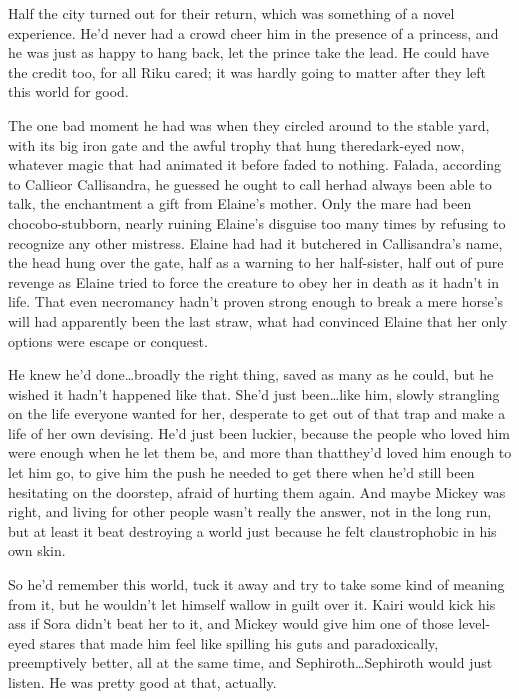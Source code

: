 Half the city turned out for their return, which was something of a novel experience. He'd never had a crowd cheer him in the presence of a princess, and he was just as happy to hang back, let the prince take the lead. He could have the credit too, for all Riku cared; it was hardly going to matter after they left this world for good.

The one bad moment he had was when they circled around to the stable yard, with its big iron gate and the awful trophy that hung there\textemdash dark-eyed now, whatever magic that had animated it before faded to nothing. Falada, according to Callie\textemdash or Callisandra, he guessed he ought to call her\textemdash had always been able to talk, the enchantment a gift from Elaine's mother. Only the mare had been chocobo-stubborn, nearly ruining Elaine's disguise too many times by refusing to recognize any other mistress. Elaine had had it butchered in Callisandra's name, the head hung over the gate, half as a warning to her half-sister, half out of pure revenge as Elaine tried to force the creature to obey her in death as it hadn't in life. That even necromancy hadn't proven strong enough to break a mere horse's will had apparently been the last straw, what had convinced Elaine that her only options were escape or conquest.

He knew he'd done\ldots broadly the right thing, saved as many as he could, but he wished it hadn't happened like that. She'd just been\ldots like him, slowly strangling on the life everyone wanted for her, desperate to get out of that trap and make a life of her own devising. He'd just been luckier, because the people who loved him were enough when he let them be, and more than that\textemdash they'd loved him enough to let him go, to give him the push he needed to get there when he'd still been hesitating on the doorstep, afraid of hurting them again. And maybe Mickey was right, and living for other people wasn't really the answer, not in the long run, but at least it beat destroying a world just because he felt claustrophobic in his own skin.

So he'd remember this world, tuck it away and try to take some kind of meaning from it, but he wouldn't let himself wallow in guilt over it. Kairi would kick his ass if Sora didn't beat her to it, and Mickey would give him one of those level-eyed stares that made him feel like spilling his guts and paradoxically, preemptively better, all at the same time, and Sephiroth\ldots Sephiroth would just listen. He was pretty good at that, actually.

